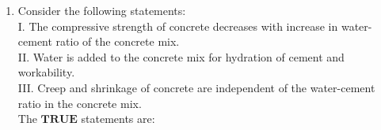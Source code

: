 \documentclass[journal]{IEEEtran}
\begin{document}
\begin{enumerate}[start=35]
\begin{center}
\end{center}
	\begin{enumerate}
	\begin{multicols}{4}
		\item $PS$
		\item $RS$
		\item $PQ$
		\item $QS$
	\end{multicols}
	\end{enumerate}
\item Consider the following statements: \\
I. The compressive strength of concrete decreases with increase in water-cement ratio of the concrete mix.\\
II. Water is added to the concrete mix for hydration of cement and workability.\\
III. Creep and shrinkage of concrete are independent of the water-cement ratio in the concrete mix.\\
The $\mathbf{TRUE}$ statements are:


\end{enumerate}
\end{document}
